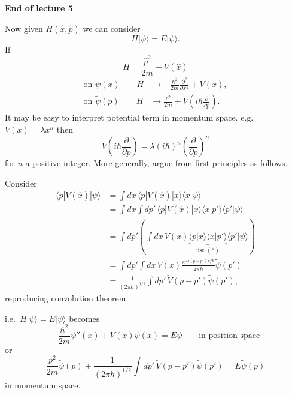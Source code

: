\documentclass[11pt,a4paper]{article}
\begin{document}
\begin{center}
    \textbf{End of lecture 5}
\end{center}

Now given $H(\hat{x},\hat{p})$ we can consider
\[
    H|\psi\rangle=E|\psi\rangle.
\]
If
\[
    H=\frac{\hat{p}^2}{2m}+V(\hat{x})
\]
\[
    \begin{aligned}
        \text{on }\psi(x)\qquad H&\to-\frac{\hbar^2}{2m}\frac{\partial^2}{\partial x^2}+V(x),\\
        \text{on }\tilde{\psi}(p)\qquad H&\to\frac{p^2}{2m}+V\!\left(i\hbar\frac{\partial}{\partial p}\right).
    \end{aligned}
\]
It may be easy to interpret potential term in momentum space.
e.g.\ $V(x)=\lambda x^n$ then
\[
    V\!\left(i\hbar\frac{\partial}{\partial p}\right)
    =\lambda(i\hbar)^n\left(\frac{\partial}{\partial p}\right)^n
\]
for $n$ a positive integer.
More generally, argue from first principles as follows.

Consider
\begin{align*}
    \langle p|V(\hat{x})|\psi\rangle
    &=\int dx\,\langle p|V(\hat{x})|x\rangle\langle x|\psi\rangle\\
    &=\int dx\int dp'\,\langle p|V(\hat{x})|x\rangle
      \langle x|p'\rangle\langle p'|\psi\rangle\\
    &=\int dp'\left(\int dx\,V(x)
      \underbrace{\langle p|x\rangle\langle x|p'\rangle}_{\text{use }(*)}
      \langle p'|\psi\rangle\right)\\
    &=\int dp'\int dx\,V(x)\frac{e^{-i(p-p')x/\hbar}}{2\pi\hbar}\tilde{\psi}(p')\\
    &=\frac{1}{(2\pi\hbar)^{1/2}}\int dp'\,\tilde{V}(p-p')\tilde{\psi}(p'),
\end{align*}
\hfill reproducing convolution theorem.

i.e.\ $H|\psi\rangle=E|\psi\rangle$ becomes
\[
    -\frac{\hbar^2}{2m}\psi''(x)+V(x)\psi(x)=E\psi
    \qquad\text{in position space}
\]
or
\[
    \frac{p^2}{2m}\tilde{\psi}(p)
    +\frac{1}{(2\pi\hbar)^{1/2}}\int dp'\,\tilde{V}(p-p')\tilde{\psi}(p')
    =E\tilde{\psi}(p)
\]
\hfill in momentum space.
\end{document}
